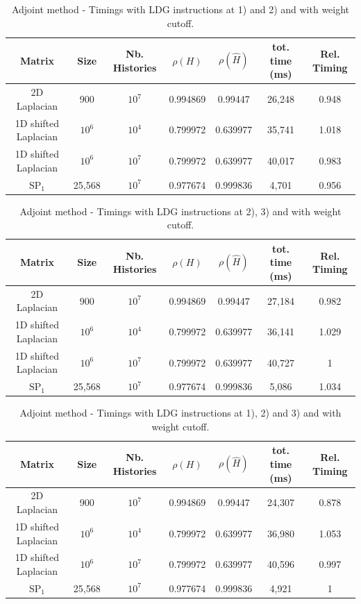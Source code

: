 \documentclass[a4paper,10pt]{article}
\begin{document}
\begin{table}[!h]
\hspace*{-1cm}
\begin{tabular}{|c|c|c|c|c|c|c|}
\hline
\textbf{Matrix} & \textbf{Size} &\textbf{Nb. Histories} & $\rho(H)$ 
& $\rho(\hat{H})$ & tot. time (ms) & Rel. Timing\\
\hline
2D Laplacian& 900 & $10^7$ & 0.994869 & 0.99447 & 26,248 & 0.948\\
\hline 
1D shifted Laplacian& $10^6$ & $10^4$ & 0.799972 & 0.639977 & 35,741 & 1.018\\
\hline
1D shifted Laplacian& $10^6$ & $10^7$ & 0.799972 & 0.639977 & 40,017 & 0.983\\
\hline
$\text{SP}_1$ & 25,568 & $10^7$ & 0.977674 & 0.999836 & 4,701 & 0.956\\
\hline
\end{tabular}
\caption{Adjoint method - Timings with LDG instructions at 1) and 2) and with 
weight cutoff.}
\label{tab15}
\end{table}



\begin{table}[!h]
\hspace*{-1cm}
\begin{tabular}{|c|c|c|c|c|c|c|}
\hline
\textbf{Matrix} & \textbf{Size} &\textbf{Nb. Histories} & $\rho(H)$ 
& $\rho(\hat{H})$ & tot. time (ms) & Rel. Timing\\
\hline
2D Laplacian& 900 & $10^7$ & 0.994869 & 0.99447 & 27,184 & 0.982\\
\hline 
1D shifted Laplacian& $10^6$ & $10^4$ & 0.799972 & 0.639977 & 36,141 & 1.029\\
\hline
1D shifted Laplacian& $10^6$ & $10^7$ & 0.799972 & 0.639977 & 40,727 & 1\\
\hline
$\text{SP}_1$ & 25,568 & $10^7$ & 0.977674 & 0.999836 & 5,086 & 1.034\\
\hline
\end{tabular}
\caption{Adjoint method - Timings with LDG instructions at 2), 3) and with 
weight cutoff.}
\label{tab16}
\end{table}




\begin{table}[!h]
\hspace*{-1cm}
\begin{tabular}{|c|c|c|c|c|c|c|}
\hline
\textbf{Matrix} & \textbf{Size} &\textbf{Nb. Histories} & $\rho(H)$ 
& $\rho(\hat{H})$ & tot. time (ms)& Rel. Timing\\
\hline
2D Laplacian& 900 & $10^7$ & 0.994869 & 0.99447 & 24,307 & 0.878\\
\hline 
1D shifted Laplacian& $10^6$ & $10^4$ & 0.799972 & 0.639977 & 36,980 & 1.053\\
\hline
1D shifted Laplacian& $10^6$ & $10^7$ & 0.799972 & 0.639977 & 40,596 & 0.997\\
\hline
$\text{SP}_1$ & 25,568 & $10^7$ & 0.977674 & 0.999836 & 4,921 & 1\\
\hline
\end{tabular}
\caption{Adjoint method - Timings with LDG instructions at 1), 2) and 3) and 
with weight cutoff.}
\label{tab17}
\end{table}
\end{document}

